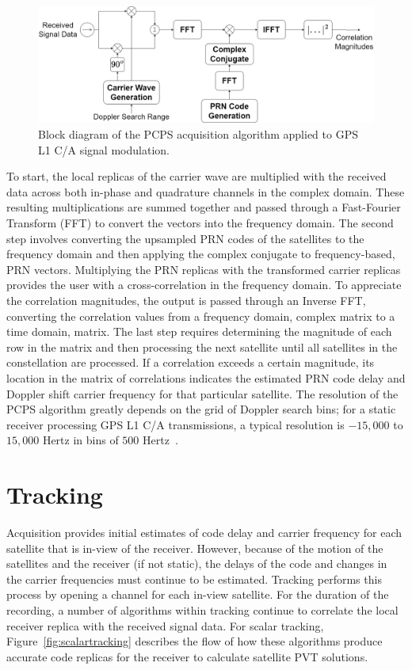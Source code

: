 \begin{figure}[!ht]\label{fig:PCPS}
    \centering
    \includegraphics[width=\linewidth]{Figures/PCPS.drawio.png}
    \caption{Block diagram of the PCPS acquisition algorithm applied to GPS L1 C/A signal modulation.}
\end{figure}

To start, the local replicas of the carrier wave are multiplied with the received data across both in-phase and quadrature channels in the complex domain. These resulting multiplications are summed together and passed through a Fast-Fourier Transform (FFT) to convert the vectors into the frequency domain. The second step involves converting the upsampled PRN codes of the satellites to the frequency domain and then applying the complex conjugate to frequency-based, PRN vectors. Multiplying the PRN replicas with the transformed carrier replicas provides the user with a cross-correlation in the frequency domain. To appreciate the correlation magnitudes, the output is passed through an Inverse FFT, converting the correlation values from a frequency domain, complex matrix to a time domain, matrix. The last step requires determining the magnitude of each row in the matrix and then processing the next satellite until all satellites in the constellation are processed. If a correlation exceeds a certain magnitude, its location in the matrix of correlations indicates the estimated PRN code delay and Doppler shift carrier frequency for that particular satellite. The resolution of the PCPS algorithm greatly depends on the grid of Doppler search bins; for a static receiver processing GPS L1 C/A transmissions, a typical resolution is \(-15,000\) to \(15,000\) Hertz in bins of \(500\) Hertz~\cite{scottRapidSignalAcquisition2001}.

\section{\textbf{Tracking}}
Acquisition provides initial estimates of code delay and carrier frequency for each satellite that is in-view of the receiver. However, because of the motion of the satellites and the receiver (if not static), the delays of the code and changes in the carrier frequencies must continue to be estimated. Tracking performs this process by opening a channel for each in-view satellite. For the duration of the recording, a number of algorithms within tracking continue to correlate the local receiver replica with the received signal data. For scalar tracking, Figure~\ref{fig:scalartracking} describes the flow of how these algorithms produce accurate code replicas for the receiver to calculate satellite PVT solutions.


